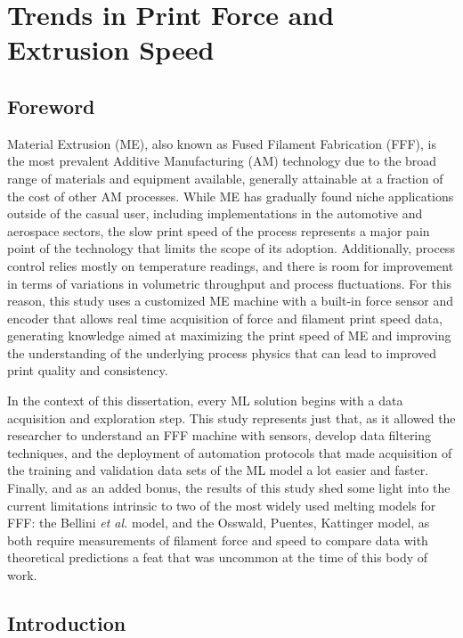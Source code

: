 \documentclass[main.tex]{subfiles}
\begin{document}
\chapter{Trends in Print Force and Extrusion Speed} \label{ch:data_ex}
\section{Foreword} \label{sec:fw_dataex}

Material Extrusion (ME), also known as Fused Filament Fabrication (FFF), is the most prevalent Additive Manufacturing (AM) technology due to the broad range of materials and equipment available, generally attainable at a fraction of the cost of other AM processes. While ME has gradually found niche applications outside of the casual user, including implementations in the automotive and aerospace sectors, the slow print speed of the process represents a major pain point of the technology that limits the scope of its adoption. Additionally, process control relies mostly on temperature readings, and there is room for improvement in terms of variations in volumetric throughput and process fluctuations. For this reason, this study uses a customized ME machine with a built-in force sensor and encoder that allows real time acquisition of force and filament print speed data, generating knowledge aimed at maximizing the print speed of ME and improving the understanding of the underlying process physics that can lead to improved print quality and consistency. 

In the context of this dissertation, every ML solution begins with a data acquisition and exploration step. This study represents just that, as it allowed the researcher to understand an FFF machine with sensors, develop data filtering techniques, and the deployment of automation protocols that made acquisition of the training and validation data sets of the ML model a lot easier and faster. Finally, and as an added bonus, the results of this study shed some light into the current limitations intrinsic to two of the most widely used melting models for FFF: the Bellini \emph{et al.} model, and the Osswald, Puentes, Kattinger model, as both require measurements of filament force and speed to compare data with theoretical predictions \textemdash a feat that was uncommon at the time of this body of work.

\section{Introduction}
\end{document}
